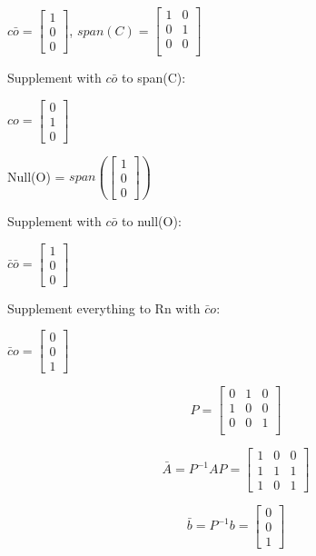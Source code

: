 \documentclass[12pt]{article}
\begin{document}
$c\bar{o} = \begin{bmatrix} 1 \\ 0 \\ 0 \end{bmatrix}$,
$span(C) = \begin{bmatrix}
    1 & 0 \\   
    0 & 1 \\
    0 & 0 \\  
\end{bmatrix}$

Supplement with $c\bar{o}$ to span(C):

$co = \begin{bmatrix} 0 \\ 1 \\ 0\end{bmatrix}$

Null(O) = $span(\begin{bmatrix} 1 \\ 0 \\ 0\end{bmatrix})$

Supplement with $c\bar{o}$ to null(O):

$\bar{c}\bar{o} = \begin{bmatrix} 1 \\ 0\\ 0\end{bmatrix}$

Supplement everything to Rn with $\bar{c}o$:

$\bar{c}o = \begin{bmatrix} 0 \\ 0 \\ 1\end{bmatrix} $

\[
P = \begin{bmatrix}
    0 & 1 & 0 \\   
    1 & 0 & 0 \\
    0 & 0 & 1 \\
\end{bmatrix}
\]

\[
\bar{A} = P^{-1}AP = \begin{bmatrix} 
1 & 0 & 0 \\
1 & 1 & 1 \\
1 & 0 & 1
\end{bmatrix}
\]

\[
\bar{b} = P^{-1}b = \begin{bmatrix} 0 \\ 0 \\ 1\end{bmatrix}
\]
\end{document}
